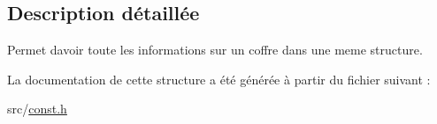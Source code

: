 \subsection{Description détaillée}
Permet d\textquotesingle{}avoir toute les informations sur un coffre dans une meme structure. 

La documentation de cette structure a été générée à partir du fichier suivant \+:\begin{DoxyCompactItemize}
\item 
src/\hyperlink{const_8h}{const.\+h}\end{DoxyCompactItemize}
